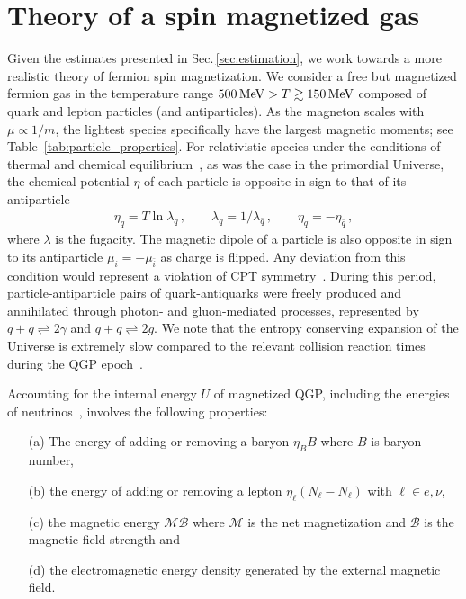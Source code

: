 \documentclass[epjST]{svjour}
\newcommand*{\MeV}{\text{\,MeV}}
\newcommand{\rsec}[1]{Sec.\,{\ref{#1}}}
\begin{document}
\section{Theory of a spin magnetized gas\label{sec:magnetization}}
{\color{blue}Given the estimates presented in \rsec{sec:estimation}, we work towards a more realistic theory of fermion spin magnetization.} We consider a free but magnetized fermion gas in the temperature range \(500\MeV>T\gtrsim150\MeV\) composed of quark and lepton particles (and antiparticles). {\color{blue}As the magneton scales with \(\mu \propto 1/m\), the lightest species specifically have the largest magnetic moments; see Table~\ref{tab:particle_properties}.} For relativistic species under the conditions of thermal and chemical equilibrium~\cite{Elze:1980er}, as was the case in the primordial Universe, the chemical potential \(\eta\) of each particle is opposite in sign to that of its antiparticle
\begin{align}
\label{eq:equilibirum_conditions}
\eta_{q}=T\ln\lambda_{q}\,,\qquad
\lambda_{q}=1/\lambda_{\bar{q}}\,,\qquad
\eta_{q}=-\eta_{\bar{q}}\,,
\end{align}
where \(\lambda\) is the fugacity. The magnetic dipole of a particle is also opposite in sign to its antiparticle $\mu_{i}=-\mu_{\bar{i}}$ as charge is flipped. Any deviation from this condition would represent a violation of CPT {\color{blue}symmetry}~\cite{Colladay:1996iz,Bluhm:1997ci,BASE:2016yuo}. During this period, particle-antiparticle pairs of quark-antiquarks were freely produced and annihilated through photon- and gluon-mediated processes, represented by \(q+\bar{q}\rightleftharpoons2\gamma\) and \(q+\bar{q}\rightleftharpoons2g\). We note that the entropy conserving expansion of the Universe is extremely slow compared to the relevant collision reaction times during the QGP epoch~\cite{Yang:2024ret}.

Accounting for the internal energy $U$ of magnetized QGP, including the energies of neutrinos~\cite{Birrell:2014ona}, involves the following properties: 
\begin{itemize}
\item[(a)] The energy of adding or removing a baryon $\eta_{B}B$ where \(B\) is baryon number,
\item[(b)] the energy of adding or removing a lepton $\eta_{\ell}(N_{\ell}-N_{\ell})$ with $\ell\in {e,\nu}$, 
\item[(c)] the magnetic energy $\mathcal{M}\mathcal{B}$ where $\mathcal{M}$ is the net magnetization and $\mathcal{B}$ is the magnetic field strength and
\item[(d)] the electromagnetic energy density generated by the external magnetic field.
\end{itemize}
\end{document}
